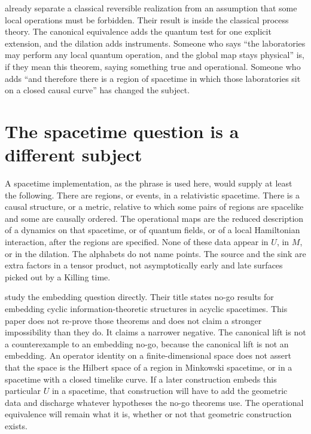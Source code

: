 \documentclass[11pt]{article}
\begin{document}
\citet{baumeler2019} already separate a classical reversible realization from an assumption that some local operations must be forbidden. Their result is inside the classical process theory. The canonical equivalence adds the quantum test for one explicit extension, and the dilation adds instruments. Someone who says ``the laboratories may perform any local quantum operation, and the global map stays physical'' is, if they mean this theorem, saying something true and operational. Someone who adds ``and therefore there is a region of spacetime in which those laboratories sit on a closed causal curve'' has changed the subject.

\section{The spacetime question is a different subject}
\label{sec:st}

A spacetime implementation, as the phrase is used here, would supply at least the following. There are regions, or events, in a relativistic spacetime. There is a causal structure, or a metric, relative to which some pairs of regions are spacelike and some are causally ordered. The operational maps are the reduced description of a dynamics on that spacetime, or of quantum fields, or of a local Hamiltonian interaction, after the regions are specified. None of these data appear in \(U\), in \(M\), or in the dilation. The alphabets do not name points. The source and the sink are extra factors in a tensor product, not asymptotically early and late surfaces picked out by a Killing time.

\citet{vilasini2024} study the embedding question directly. Their title states no-go results for embedding cyclic information-theoretic structures in acyclic spacetimes. This paper does not re-prove those theorems and does not claim a stronger impossibility than they do. It claims a narrower negative. The canonical lift is not a counterexample to an embedding no-go, because the canonical lift is not an embedding. An operator identity on a finite-dimensional space does not assert that the space is the Hilbert space of a region in Minkowski spacetime, or in a spacetime with a closed timelike curve. If a later construction embeds this particular \(U\) in a spacetime, that construction will have to add the geometric data and discharge whatever hypotheses the no-go theorems use. The operational equivalence will remain what it is, whether or not that geometric construction exists.
\end{document}
